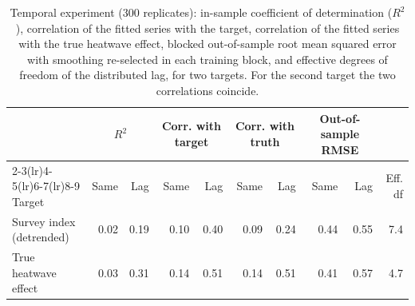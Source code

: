 \documentclass[11pt,a4paper]{article}
\begin{document}
\begin{table}[htbp]
\centering\scriptsize
\setlength{\tabcolsep}{3pt}
\caption{Temporal experiment (300 replicates): in-sample coefficient of determination ($R^2$), correlation of the fitted series with the target, correlation of the fitted series with the true heatwave effect, blocked out-of-sample root mean squared error with smoothing re-selected in each training block, and effective degrees of freedom of the distributed lag, for two targets. For the second target the two correlations coincide.}
\label{tab:temporal}
\begin{tabular}{@{}lrrrrrrrrr@{}}
\toprule
 & \multicolumn{2}{c}{$R^2$} & \multicolumn{2}{c}{Corr. with target} & \multicolumn{2}{c}{Corr. with truth} & \multicolumn{2}{c}{Out-of-sample RMSE} & \\
\cmidrule(lr){2-3}\cmidrule(lr){4-5}\cmidrule(lr){6-7}\cmidrule(lr){8-9}
Target & Same & Lag & Same & Lag & Same & Lag & Same & Lag & Eff. df \\
\midrule
Survey index (detrended) & 0.02 & 0.19 & 0.10 & 0.40 & 0.09 & 0.24 & 0.44 & 0.55 & 7.4 \\
True heatwave effect & 0.03 & 0.31 & 0.14 & 0.51 & 0.14 & 0.51 & 0.41 & 0.57 & 4.7 \\
\bottomrule
\end{tabular}
\end{table}
\end{document}
